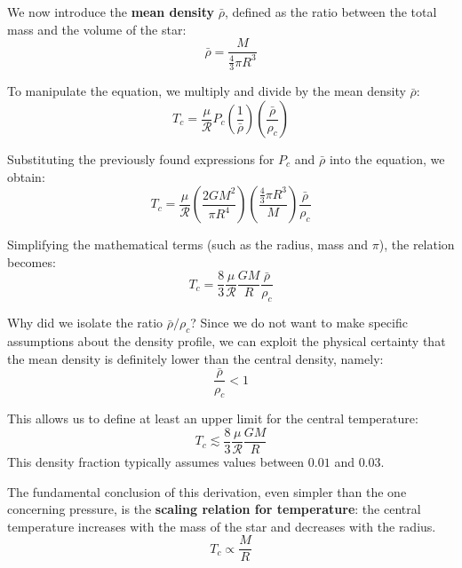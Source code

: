 We now introduce the \textbf{mean density} $\bar{\rho}$, defined as the ratio between the total mass and the volume of the star:
\begin{equation}
\bar{\rho} = \frac{M}{\frac{4}{3}\pi R^3}
\end{equation}

To manipulate the equation, we multiply and divide by the mean density $\bar{\rho}$:
\begin{equation}
T_c = \frac{\mu}{\mathcal{R}} P_c \left(\frac{1}{\bar{\rho}}\right) \left(\frac{\bar{\rho}}{\rho_c}\right)
\end{equation}

Substituting the previously found expressions for $P_c$ and $\bar{\rho}$ into the equation, we obtain:
\begin{equation}
T_c = \frac{\mu}{\mathcal{R}} \left( \frac{2 G M^2}{\pi R^4} \right) \left( \frac{\frac{4}{3}\pi R^3}{M} \right) \frac{\bar{\rho}}{\rho_c}
\end{equation}

Simplifying the mathematical terms (such as the radius, mass and $\pi$), the relation becomes:
\begin{equation}
T_c = \frac{8}{3} \frac{\mu}{\mathcal{R}} \frac{G M}{R} \frac{\bar{\rho}}{\rho_c}
\end{equation}

Why did we isolate the ratio $\bar{\rho} / \rho_c$? Since we do not want to make specific assumptions about the density profile, we can exploit the physical certainty that the mean density is definitely lower than the central density, namely:
\begin{equation}
\frac{\bar{\rho}}{\rho_c} < 1
\end{equation}

This allows us to define at least an upper limit for the central temperature:
\begin{equation}
T_c \lesssim \frac{8}{3} \frac{\mu}{\mathcal{R}} \frac{G M}{R}
\end{equation}
This density fraction typically assumes values between $0.01$ and $0.03$.

The fundamental conclusion of this derivation, even simpler than the one concerning pressure, is the \textbf{scaling relation for temperature}: the central temperature increases with the mass of the star and decreases with the radius.
\begin{equation}
T_c \propto \frac{M}{R}
\end{equation}

